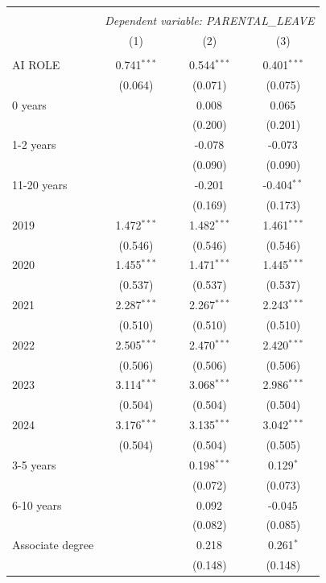 \begin{table}[!htbp] \centering
\begin{tabular}{@{\extracolsep{5pt}}lccc}
\\[-1.8ex]\hline
\hline \\[-1.8ex]
& \multicolumn{3}{c}{\textit{Dependent variable: PARENTAL_LEAVE}} \
\cr \cline{2-4}
\\[-1.8ex] & (1) & (2) & (3) \\
\hline \\[-1.8ex]
 AI ROLE & 0.741$^{***}$ & 0.544$^{***}$ & 0.401$^{***}$ \\
& (0.064) & (0.071) & (0.075) \\
 0 years & & 0.008$^{}$ & 0.065$^{}$ \\
& & (0.200) & (0.201) \\
 1-2 years & & -0.078$^{}$ & -0.073$^{}$ \\
& & (0.090) & (0.090) \\
 11-20 years & & -0.201$^{}$ & -0.404$^{**}$ \\
& & (0.169) & (0.173) \\
 2019 & 1.472$^{***}$ & 1.482$^{***}$ & 1.461$^{***}$ \\
& (0.546) & (0.546) & (0.546) \\
 2020 & 1.455$^{***}$ & 1.471$^{***}$ & 1.445$^{***}$ \\
& (0.537) & (0.537) & (0.537) \\
 2021 & 2.287$^{***}$ & 2.267$^{***}$ & 2.243$^{***}$ \\
& (0.510) & (0.510) & (0.510) \\
 2022 & 2.505$^{***}$ & 2.470$^{***}$ & 2.420$^{***}$ \\
& (0.506) & (0.506) & (0.506) \\
 2023 & 3.114$^{***}$ & 3.068$^{***}$ & 2.986$^{***}$ \\
& (0.504) & (0.504) & (0.504) \\
 2024 & 3.176$^{***}$ & 3.135$^{***}$ & 3.042$^{***}$ \\
& (0.504) & (0.504) & (0.505) \\
 3-5 years & & 0.198$^{***}$ & 0.129$^{*}$ \\
& & (0.072) & (0.073) \\
 6-10 years & & 0.092$^{}$ & -0.045$^{}$ \\
& & (0.082) & (0.085) \\
 Associate degree & & 0.218$^{}$ & 0.261$^{*}$ \\
& & (0.148) & (0.148) \\

\end{tabular}
\end{table}
